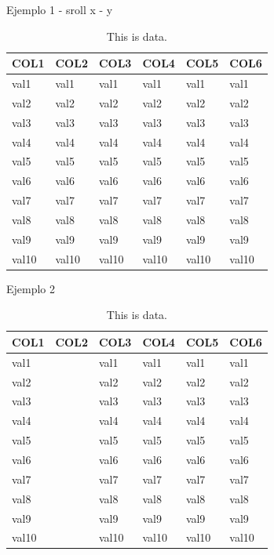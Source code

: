 \documentclass[
]{article}
\begin{document}
Ejemplo 1 - sroll x - y

\begin{table}

\caption{\label{tab:unnamed-chunk-9}This is data.}
\centering
\fontsize{16}{18}\selectfont
\begin{tabu} to 
\hline
COL1 & COL2 & COL3 & COL4 & COL5 & COL6\\
\hline
val1 & val1 & val1 & val1 & val1 & val1\\
\hline
val2 & val2 & val2 & val2 & val2 & val2\\
\hline
val3 & val3 & val3 & val3 & val3 & val3\\
\hline
val4 & val4 & val4 & val4 & val4 & val4\\
\hline
val5 & val5 & val5 & val5 & val5 & val5\\
\hline
val6 & val6 & val6 & val6 & val6 & val6\\
\hline
val7 & val7 & val7 & val7 & val7 & val7\\
\hline
val8 & val8 & val8 & val8 & val8 & val8\\
\hline
val9 & val9 & val9 & val9 & val9 & val9\\
\hline
val10 & val10 & val10 & val10 & val10 & val10\\
\hline
\end{tabu}
\end{table}

Ejemplo 2

\begin{table}

\caption{\label{tab:unnamed-chunk-10}This is data.}
\centering
\fontsize{16}{18}\selectfont
\begin{tabu} to 
\hline
COL1 & COL2 & COL3 & COL4 & COL5 & COL6\\
\hline
val1 &  & val1 & val1 & val1 & val1\\
\hline
val2 &  & val2 & val2 & val2 & val2\\
\hline
val3 &  & val3 & val3 & val3 & val3\\
\hline
val4 &  & val4 & val4 & val4 & val4\\
\hline
val5 &  & val5 & val5 & val5 & val5\\
\hline
val6 &  & val6 & val6 & val6 & val6\\
\hline
val7 &  & val7 & val7 & val7 & val7\\
\hline
val8 &  & val8 & val8 & val8 & val8\\
\hline
val9 &  & val9 & val9 & val9 & val9\\
\hline
val10 &  & val10 & val10 & val10 & val10\\
\hline
\end{tabu}
\end{table}
\end{document}

